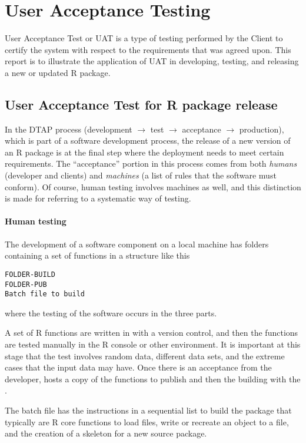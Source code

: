 \documentclass[oneside,a4paper]{memoir} %
\begin{document}
\chapter{User Acceptance Testing}

User Acceptance Test or \gls{UAT} is a type of testing performed by the Client to certify the system with respect to the requirements that was agreed upon. 
This report is to illustrate the application of \gls{UAT} in developing, testing, and releasing a new or updated \textsf{R} package.

\section{User Acceptance Test for R package release}
In the DTAP process (development $\to$ test $\to$ acceptance $\to$ production), which is part of a software development process, the release of a new version of an \textsf{R} package is at the final step where the deployment needs to meet certain requirements. The \enquote{acceptance} portion in this process comes from both \emph{humans} (developer and clients) and \emph{machines} (a list of rules that the software must conform). Of course, human testing involves machines as well, and this distinction is made for referring to a systematic way of testing. 


\subsubsection{Human testing}
The development of a software component on a local machine has folders containing a set of functions in a structure like this

\begin{verbatim}
FOLDER-BUILD
FOLDER-PUB
Batch file to build
\end{verbatim}
where the testing of the software occurs in the three parts. 

\bigbreak
\noindent
A set of \textsf{R} functions are written in  with a version control, and then the functions are tested manually in the \textsf{R} console or other environment. It is important at this stage that the test involves random data, different data sets, and the extreme cases that the input data may have. Once there is an acceptance from the developer,  hosts a copy of the functions to publish and then the building with the .

The batch file has the instructions in a sequential list to build the package that typically are \textsf{R} core functions to load files, write or recreate an object to a file, and the creation of a skeleton for a new source package.
\end{document}

